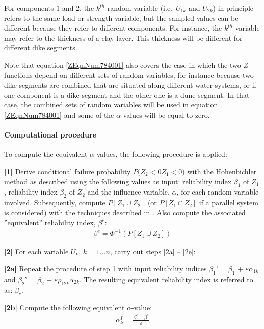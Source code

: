 For components $1$ and $2$, the $k^{th}$ random variable (i.e.\ $U_{1k}$ and $U_{2k}$) in principle refers to the same load or strength variable, but the sampled values can be different because they refer to different components. For instance, the $k^{th}$ variable may refer to the thickness of a clay layer. This thickness will be different for different dike segments. 

Note that equation \eqref{ZEqnNum784001} also covers the case in which the two $Z$-functions depend on different sets of random variables, for instance because two dike segments are combined that are situated along different water systems, or if one component is a dike segment and the other one is a dune segment. In that case, the combined sets of random variables will be used in equation \eqref{ZEqnNum784001} and some of the $\alpha$-values will be equal to zero.

\paragraph*{Computational procedure}

To compute the equivalent $\alpha$-values, the following procedure is applied:

\textbf{[1]} Derive conditional failure probability $P(Z_2<0$\textbar $Z_1<0)$ with the Hohenbichler method as described  using the following values as input: reliability index $\beta_1$ of $Z_1$, reliability index $\beta_2$ of $Z_2$ and the influence variable, $\alpha $, for each random variable involved. Subsequently, compute $P[Z_1\cup Z_2]$ (or $P[Z_1\cap Z_2]$ if a parallel system is considered) with the techniques described in . Also compute the associated ''equivalent'' reliability index, $\beta^e$:
\begin{align}
\beta ^{e} =\Phi ^{-1} \left(P\left[Z_{1} \cup Z_{2} \right]\right)\label{eq:smXX1} 
\end{align}

\textbf{[2]} For each variable $U_k$, $k=1...n$, carry out steps [2a] -- [2e]: 

\textbf{[2a]} Repeat the procedure of step 1 with input reliability indices $\beta_1$' = $\beta_1$ + $\varepsilon$$\alpha_{1k}$ and $\beta_2$' = $\beta_2$ + $\varepsilon\rho_{12k}\alpha_{2k}$. The resulting equivalent reliability index is referred to as: $\beta_c$.

\textbf{[2b]} Compute the following equivalent $\alpha$-value:
\begin{align}
\alpha _{k}^{I} =\frac{\beta ^{c} -\beta ^{e} }{\varepsilon } \label{0.104)} 
\end{align}

